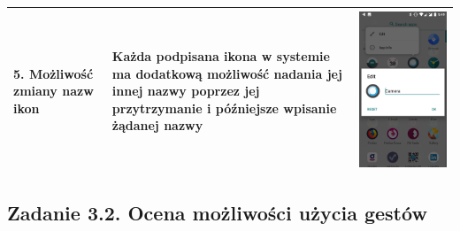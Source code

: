 \documentclass[12pt]{article}
\begin{document}
\begin{longtable}{|p{}|p{}|p{}|}
        5. Możliwość zmiany nazw ikon & Każda podpisana ikona w systemie ma dodatkową możliwość nadania jej innej nazwy poprzez jej przytrzymanie i późniejsze wpisanie żądanej nazwy& \includegraphics[scale=0.1]{changename.png}\\
        \hline
    \end{longtable}

    \subsection{Zadanie 3.2. Ocena możliwości użycia gestów}
\end{document}

